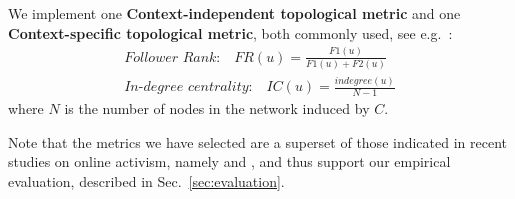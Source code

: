 We implement one \textbf{Context-independent topological metric} and one \textbf{Context-specific topological metric}, both commonly used, see e.g.~\cite{RIQUELME2016949}:
\begin{align}
\textit{Follower Rank:}  \quad \mathit{FR}(u) = \frac{\mathit{F1}(u)}{\mathit{F1}(u)+\mathit{F2}(u)}   \label{eq:FR}\\
\textit{In-degree centrality:} \quad \mathit{IC}(u) = \frac{\mathit{indegree}(u)}{N-1}  \label{eq:IDC}
\end{align}
where $N$ is the number of nodes in the network induced by $C$.

Note that the metrics we have selected are a superset of those indicated in recent studies on online activism, namely \cite{Lotan2011} and \cite{Poell2014}, and thus support our empirical evaluation, described in Sec.~\ref{sec:evaluation}.

